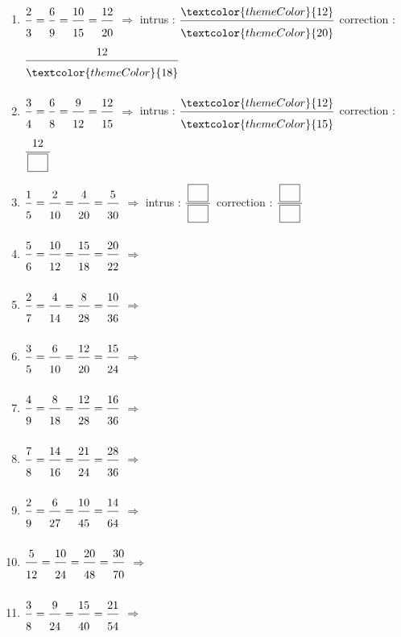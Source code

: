 \begin{enumerate}[leftmargin=*,align=parleft, label=\alph*), itemsep=9pt]
\item $\FA{2}{3}=\FA{6}{9}=\FA{10}{15}=\FA{12}{20}$ \quad $\Longrightarrow$ \quad intrus : $\FA{\textcolor{themeColor}{12}}{\textcolor{themeColor}{20}}$ \quad correction : $\FA{12}{\textcolor{themeColor}{18}}$
\item $\FA{3}{4}=\FA{6}{8}=\FA{9}{12}=\FA{12}{15}$ \quad $\Longrightarrow$ \quad intrus : $\FA{\textcolor{themeColor}{12}}{\textcolor{themeColor}{15}}$ \quad correction : $\FA{12}{\CaseC}$
\item $\FA{1}{5}=\FA{2}{10}=\FA{4}{20}=\FA{5}{30}$ \quad $\Longrightarrow$ \quad intrus : $\FA{\CaseC}{\CaseC}$ \quad correction : $\FA{\CaseC}{\CaseC}$
\item $\FA{5}{6}=\FA{10}{12}=\FA{15}{18}=\FA{20}{22}$ \quad $\Longrightarrow$
\item $\FA{2}{7}=\FA{4}{14}=\FA{8}{28}=\FA{10}{36}$ \quad $\Longrightarrow$
\item $\FA{3}{5}=\FA{6}{10}=\FA{12}{20}=\FA{15}{24}$ \quad $\Longrightarrow$
\item $\FA{4}{9}=\FA{8}{18}=\FA{12}{28}=\FA{16}{36}$ \quad $\Longrightarrow$
\item $\FA{7}{8}=\FA{14}{16}=\FA{21}{24}=\FA{28}{36}$ \quad $\Longrightarrow$
\item $\FA{2}{9}=\FA{6}{27}=\FA{10}{45}=\FA{14}{64}$ \quad $\Longrightarrow$
\item $\FA{5}{12}=\FA{10}{24}=\FA{20}{48}=\FA{30}{70}$ \quad $\Longrightarrow$
\item $\FA{3}{8}=\FA{9}{24}=\FA{15}{40}=\FA{21}{54}$ \quad $\Longrightarrow$
\end{enumerate}
 
\newpage
{}
 
